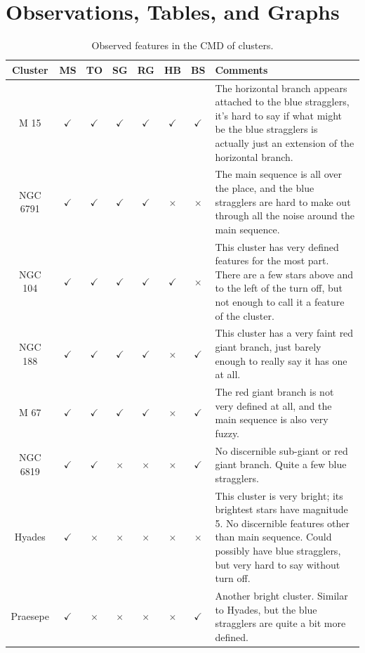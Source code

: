 \documentclass[11pt]{article}
\begin{document}
\section{Observations, Tables, and Graphs}

\begin{landscape}
\begin{table}[h]
\caption{Observed features in the CMD of clusters.}
\begin{tabular}{| c | c | c | c | c | c | c | p{11cm} |}
	\hline
	Cluster & MS & TO & SG & RG & HB & BS & Comments \\ \hline
	M 15 & $\checkmark$ & $\checkmark$ & $\checkmark$ & $\checkmark$ & $\checkmark$ & $\checkmark$ & The horizontal branch appears attached to the blue stragglers, it's hard to say if what might be the blue stragglers is actually just an extension of the horizontal branch. \\ \hline
	NGC 6791 & $\checkmark$ & $\checkmark$ & $\checkmark$ & $\checkmark$ & $\times$ & $\times$ & The main sequence is all over the place, and the blue stragglers are hard to make out through all the noise around the main sequence. \\ \hline
	NGC 104 & $\checkmark$ & $\checkmark$ & $\checkmark$ & $\checkmark$ & $\checkmark$ & $\times$ & This cluster has very defined features for the most part. There are a few stars above and to the left of the turn off, but not enough to call it a feature of the cluster. \\ \hline
	NGC 188& $\checkmark$ & $\checkmark$ & $\checkmark$ & $\checkmark$ & $\times$ & $\checkmark$ & This cluster has a very faint red giant branch, just barely enough to really say it has one at all. \\ \hline
	M 67 & $\checkmark$ & $\checkmark$ & $\checkmark$ & $\checkmark$ & $\times$ & $\checkmark$ & The red giant branch is not very defined at all, and the main sequence is also very fuzzy. \\ \hline
	NGC 6819 & $\checkmark$ & $\checkmark$ & $\times$ & $\times$ & $\times$ & $\checkmark$ & No discernible sub-giant or red giant branch. Quite a few blue stragglers. \\ \hline
	Hyades & $\checkmark$ & $\times$ & $\times$ & $\times$ & $\times$ & $\times$ & This cluster is very bright; its brightest stars have magnitude 5. No discernible features other than main sequence. Could possibly have blue stragglers, but very hard to say without turn off. \\ \hline
	Praesepe & $\checkmark$ & $\times$ & $\times$ & $\times$ & $\times$ & $\checkmark$ & Another bright cluster. Similar to Hyades, but the blue stragglers are quite a bit more defined. \\ \hline

\end{tabular}
\end{table}
\end{landscape}
\end{document}
